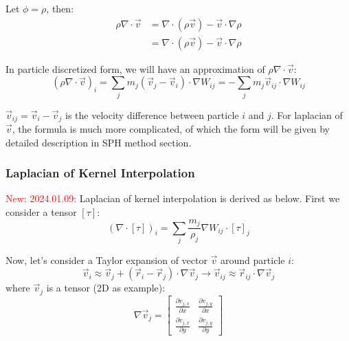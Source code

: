 Let $\phi = \rho$, 
then:
\begin{equation}
    \begin{aligned}
        \rho\nabla\cdot \vec{v} &= \nabla\cdot(\rho \vec{v}) - \vec{v}\cdot\nabla\rho\\
        &=
        \nabla\cdot(\rho \vec{v}) - \vec{v}\cdot\nabla\rho
    \end{aligned}
\end{equation}

In particle discretized form, we will have an approximation of $\rho\nabla\cdot \vec{v}$:
\begin{equation}
    \left(\rho\nabla\cdot \vec{v}\right)_i
    =
    \sum_j m_j
    (\vec{v}_j - \vec{v}_i)\cdot\nabla W_{ij}
    =-\sum_j m_j \vec{v}_{ij}\cdot\nabla W_{ij}
\end{equation}

$\vec{v}_{ij} = \vec{v}_i - \vec{v}_j$ is the velocity difference between particle $i$ and $j$.
For laplacian of $\vec{v}$,
the formula is much more complicated, 
of which the form will be given by detailed description in SPH method section.

\subsubsection{Laplacian of Kernel Interpolation}

\textcolor{red}{New: 2024.01.09:} 
Laplacian of kernel interpolation is derived as below.
First we consider a tensor $[\tau]$:
\begin{equation}
    (\nabla\cdot[\tau])_i = \sum_j \frac{m_j}{\rho_j} \nabla W_{ij}
    \cdot [\tau]_j
\end{equation}

Now, let's consider a Taylor expansion of vector $\vec{v}$ around particle $i$:
\begin{equation}
    \vec{v}_i \approx
    \vec{v}_j + (\vec{r}_i - \vec{r}_j)\cdot \nabla\vec{v}_j
    \to
    \vec{v}_{ij} \approx \vec{r}_{ij}\cdot \nabla\vec{v}_j
\end{equation}
where $\vec{v}_j$ is a tensor (2D as example):
\begin{equation}
    \nabla\vec{v}_j =
    \begin{bmatrix}
        \frac{\partial v_{j,x}}{\partial x} & \frac{\partial v_{j,y}}{\partial x} \\
        \frac{\partial v_{j,x}}{\partial y} & \frac{\partial v_{j,y}}{\partial y} 
    \end{bmatrix}
\end{equation}

